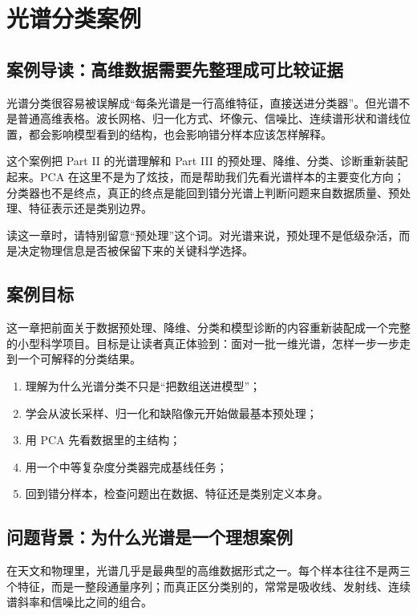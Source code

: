 \chapter{光谱分类案例}

\section{案例导读：高维数据需要先整理成可比较证据}

光谱分类很容易被误解成“每条光谱是一行高维特征，直接送进分类器”。但光谱不是普通高维表格。波长网格、归一化方式、坏像元、信噪比、连续谱形状和谱线位置，都会影响模型看到的结构，也会影响错分样本应该怎样解释。

这个案例把 Part II 的光谱理解和 Part III 的预处理、降维、分类、诊断重新装配起来。PCA 在这里不是为了炫技，而是帮助我们先看光谱样本的主要变化方向；分类器也不是终点，真正的终点是能回到错分光谱上判断问题来自数据质量、预处理、特征表示还是类别边界。

读这一章时，请特别留意“预处理”这个词。对光谱来说，预处理不是低级杂活，而是决定物理信息是否被保留下来的关键科学选择。

\section{案例目标}

这一章把前面关于数据预处理、降维、分类和模型诊断的内容重新装配成一个完整的小型科学项目。目标是让读者真正体验到：面对一批一维光谱，怎样一步一步走到一个可解释的分类结果。

\begin{enumerate}
    \item 理解为什么光谱分类不只是“把数组送进模型”；
    \item 学会从波长采样、归一化和缺陷像元开始做最基本预处理；
    \item 用 PCA 先看数据里的主结构；
    \item 用一个中等复杂度分类器完成基线任务；
    \item 回到错分样本，检查问题出在数据、特征还是类别定义本身。
\end{enumerate}

\section{问题背景：为什么光谱是一个理想案例}

在天文和物理里，光谱几乎是最典型的高维数据形式之一。每个样本往往不是两三个特征，而是一整段通量序列；而真正区分类别的，常常是吸收线、发射线、连续谱斜率和信噪比之间的组合。

